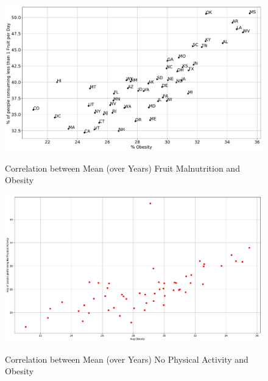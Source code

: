 \documentclass{article}
\begin{document}
\begin{figure}[h]
\centering
\caption{Correlation between Mean (over Years) Fruit Malnutrition and Obesity}
\includegraphics[width=\linewidth]{images/exploration_fruit_malnutrition_vs_obesity.pdf}
\label{fig:fruitMalnutritionVsObesity}
\end{figure}
\begin{figure}[h]
	\centering
	\caption{Correlation between Mean (over Years) No Physical Activity and Obesity}
	\includegraphics[width=\linewidth]{images/exploration_no_phy_activity_obesity.pdf}
	\label{fig:noPhyActivityVsObesity}
\end{figure}
\end{document}
